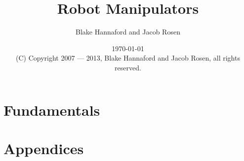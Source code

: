 \documentclass[letterpaper]{book}
\begin{document}
\setpagewiselinenumbers        %
\modulolinenumbers[5]


\frontmatter

\title{Robot Manipulators}

\author{Blake Hannaford and Jacob Rosen}

\date{\today\\(C) Copyright 2007 --- 2013, Blake Hannaford and Jacob Rosen, all rights reserved. }

\maketitle

\tableofcontents

\mainmatter

\linenumbers

 \part{Fundamentals}

%
%
 \part{Appendices}
 \appendix
%
 

\backmatter
%
\label{LastPage}
\end{document}
